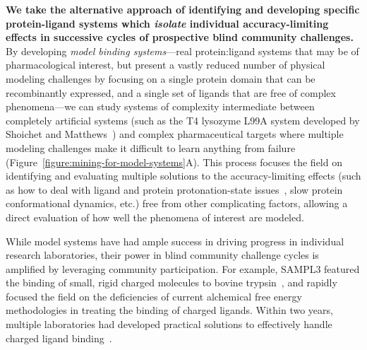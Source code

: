 \documentclass[11pt]{article}
\begin{document}
 {\bf We take the alternative approach of identifying and developing specific protein-ligand systems which \emph{isolate} individual accuracy-limiting effects in successive cycles of prospective blind community challenges.}
By developing \emph{model binding systems}---real protein:ligand systems that may be of pharmacological interest, but present a vastly reduced number of physical modeling challenges by focusing on a single protein domain that can be recombinantly expressed, and a single set of ligands that are free of complex phenomena---we can study systems of complexity intermediate between completely artificial systems (such as the T4 lysozyme L99A system developed by Shoichet and Matthews~\cite{mobley_predicting_2007,merski_homologous_2015, mobley_predicting_2016}) and complex pharmaceutical targets where multiple modeling challenges make it difficult to learn anything from failure (Figure~\ref{figure:mining-for-model-systems}A).
This process focuses the field on identifying and evaluating multiple solutions to the accuracy-limiting effects (such as how to deal with ligand and protein protonation-state issues~\cite{Onufriev:2013:QuarterlyReviewsofBiophysics}, slow protein conformational dynamics, etc.) free from other complicating factors, allowing a direct evaluation of how well the phenomena of interest are modeled.


While model systems have had ample success in driving progress in individual research laboratories, their power in blind community challenge cycles is amplified by leveraging community participation.
For example, SAMPL3 featured the binding of small, rigid charged molecules to bovine trypsin~\cite{Newman:2011:JComputAidedMolDes}, and rapidly focused the field on the deficiencies of current alchemical free energy methodologies in treating the binding of charged ligands.
Within two years, multiple laboratories had developed practical solutions to effectively handle charged ligand binding~\cite{Rocklin:2013:TheJournalofChemicalPhysics, lin_overview_2014, Reif:2014:JournalofComputationalChemistry}.
\end{document}
